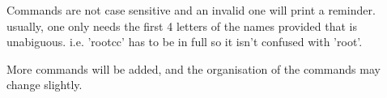    Commands are not case sensitive and an invalid one will print a reminder.
   usually, one only needs the first 4 letters of the names provided that is
   unabiguous. i.e. 'rootcc' has to be in full so it isn't confused with
   'root'.

   More commands will be added, and the organisation of the commands
   may change slightly.

